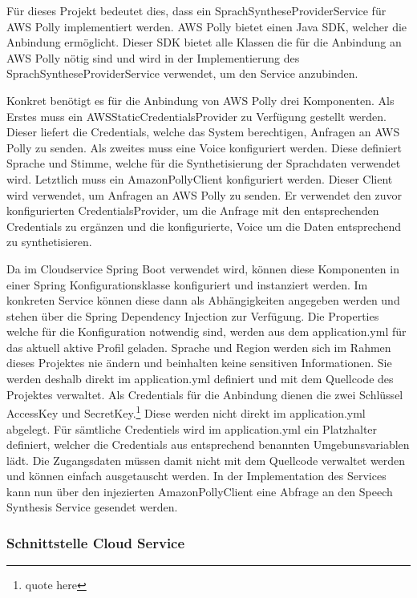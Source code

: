 Für dieses Projekt bedeutet dies, dass ein SprachSyntheseProviderService für AWS Polly implementiert werden.
AWS Polly bietet einen Java SDK, welcher die Anbindung ermöglicht.
Dieser SDK bietet alle Klassen die für die Anbindung an AWS Polly nötig sind und wird in der Implementierung des SprachSyntheseProviderService verwendet, um den Service anzubinden.

Konkret benötigt es für die Anbindung von AWS Polly drei Komponenten.
Als Erstes muss ein AWSStaticCredentialsProvider zu Verfügung gestellt werden.
Dieser liefert die Credentials, welche das System berechtigen, Anfragen an AWS Polly zu senden.
Als zweites muss eine Voice konfiguriert werden.
Diese definiert Sprache und Stimme, welche für die Synthetisierung der Sprachdaten verwendet wird.
Letztlich muss ein AmazonPollyClient konfiguriert werden.
Dieser Client wird verwendet, um Anfragen an AWS Polly zu senden.
Er verwendet den zuvor konfigurierten CredentialsProvider, um die Anfrage mit den entsprechenden Credentials zu ergänzen
und die konfigurierte, Voice um die Daten entsprechend zu synthetisieren.

Da im Cloudservice Spring Boot verwendet wird, können diese Komponenten in einer Spring Konfigurationsklasse konfiguriert und instanziert werden.
Im konkreten Service können diese dann als Abhängigkeiten angegeben werden und stehen über die Spring Dependency Injection zur Verfügung.
Die Properties welche für die Konfiguration notwendig sind, werden aus dem application.yml für das aktuell aktive Profil geladen.
Sprache und Region werden sich im Rahmen dieses Projektes nie ändern und beinhalten keine sensitiven Informationen.
Sie werden deshalb direkt im application.yml definiert und mit dem Quellcode des Projektes verwaltet.
Als Credentials für die Anbindung dienen die zwei Schlüssel AccessKey und SecretKey.\footnote{quote here}
Diese werden nicht direkt im application.yml abgelegt.
Für sämtliche Credentiels wird im application.yml ein Platzhalter definiert, welcher die Credentials aus entsprechend benannten Umgebunsvariablen lädt.
Die Zugangsdaten müssen damit nicht mit dem Quellcode verwaltet werden und können einfach ausgetauscht werden.
In der Implementation des Services kann nun über den injezierten AmazonPollyClient eine Abfrage an den Speech Synthesis Service gesendet werden.

\subsubsection{Schnittstelle Cloud Service}

